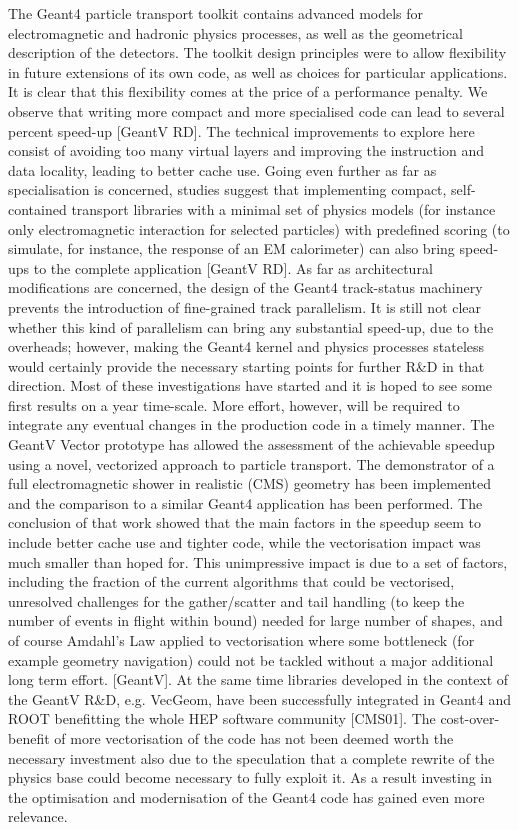 \documentclass[10pt,a4paper]{article}
\begin{document}
The Geant4 particle transport toolkit contains advanced models for
electromagnetic and hadronic physics processes, as well as the
geometrical description of the detectors. The toolkit design principles
were to allow flexibility in future extensions of its own code, as well
as choices for particular applications. It is clear that this
flexibility comes at the price of a performance penalty. We observe that
writing more compact and more specialised code can lead to several
percent speed-up {[}GeantV RD{]}. The technical improvements to explore
here consist of avoiding too many virtual layers and improving the
instruction and data locality, leading to better cache use. Going even
further as far as specialisation is concerned, studies suggest that
implementing compact, self-contained transport libraries with a minimal
set of physics models (for instance only electromagnetic interaction for
selected particles) with predefined scoring (to simulate, for instance,
the response of an EM calorimeter) can also bring speed-ups to the
complete application {[}GeantV RD{]}. As far as architectural
modifications are concerned, the design of the Geant4 track-status
machinery prevents the introduction of fine-grained track parallelism.
It is still not clear whether this kind of parallelism can bring any
substantial speed-up, due to the overheads; however, making the Geant4
kernel and physics processes stateless would certainly provide the
necessary starting points for further R\&D in that direction. Most of
these investigations have started and it is hoped to see some first
results on a year time-scale. More effort, however, will be required to
integrate any eventual changes in the production code in a timely
manner. The GeantV Vector prototype has allowed the assessment of the
achievable speedup using a novel, vectorized approach to particle
transport. The demonstrator of a full electromagnetic shower in
realistic (CMS) geometry has been implemented and the comparison to a
similar Geant4 application has been performed. The conclusion of that
work showed that the main factors in the speedup seem to include better
cache use and tighter code, while the vectorisation impact was much
smaller than hoped for. This unimpressive impact is due to a set of
factors, including the fraction of the current algorithms that could be
vectorised, unresolved challenges for the gather/scatter and tail
handling (to keep the number of events in flight within bound) needed
for large number of shapes, and of course Amdahl's Law applied to
vectorisation where some bottleneck (for example geometry navigation)
could not be tackled without a major additional long term effort.
{[}GeantV{]}. At the same time libraries developed in the context of the
GeantV R\&D, e.g. VecGeom, have been successfully integrated in Geant4
and ROOT benefitting the whole HEP software community {[}CMS01{]}. The
cost-over-benefit of more vectorisation of the code has not been deemed
worth the necessary investment also due to the speculation that a
complete rewrite of the physics base could become necessary to fully
exploit it. As a result investing in the optimisation and modernisation
of the Geant4 code has gained even more relevance.
\end{document}
